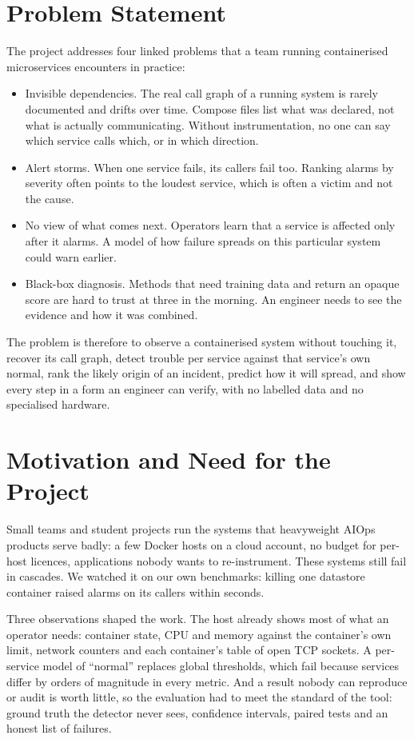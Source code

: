 \section{Problem Statement}
The project addresses four linked problems that a team running containerised microservices encounters in practice:

\begin{itemize}
\item Invisible dependencies. The real call graph of a running system is rarely documented and drifts over time. Compose files list what was declared, not what is actually communicating. Without instrumentation, no one can say which service calls which, or in which direction.
\item Alert storms. When one service fails, its callers fail too. Ranking alarms by severity often points to the loudest service, which is often a victim and not the cause.
\item No view of what comes next. Operators learn that a service is affected only after it alarms. A model of how failure spreads on this particular system could warn earlier.
\item Black-box diagnosis. Methods that need training data and return an opaque score are hard to trust at three in the morning. An engineer needs to see the evidence and how it was combined.
\end{itemize}

The problem is therefore to observe a containerised system without touching it, recover its call graph, detect trouble per service against that service's own normal, rank the likely origin of an incident, predict how it will spread, and show every step in a form an engineer can verify, with no labelled data and no specialised hardware.

\section{Motivation and Need for the Project}
Small teams and student projects run the systems that heavyweight AIOps products serve badly: a few Docker hosts on a cloud account, no budget for per-host licences, applications nobody wants to re-instrument. These systems still fail in cascades. We watched it on our own benchmarks: killing one datastore container raised alarms on its callers within seconds.

Three observations shaped the work. The host already shows most of what an operator needs: container state, CPU and memory against the container's own limit, network counters and each container's table of open TCP sockets. A per-service model of ``normal'' replaces global thresholds, which fail because services differ by orders of magnitude in every metric. And a result nobody can reproduce or audit is worth little, so the evaluation had to meet the standard of the tool: ground truth the detector never sees, confidence intervals, paired tests and an honest list of failures.

